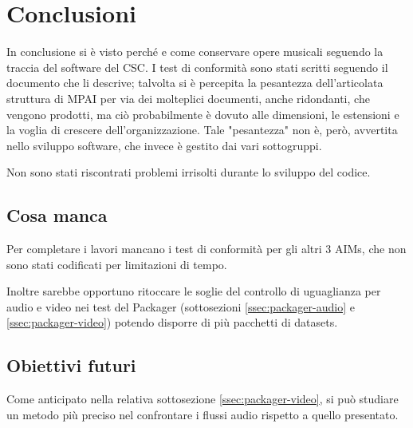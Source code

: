 
\chapter{Conclusioni} \label{chp:conclusioni}
In conclusione si è visto perché e come conservare opere musicali seguendo la traccia del software del \ac{CSC}.
I test di conformità sono stati scritti seguendo il documento che li descrive; talvolta si è percepita la pesantezza dell'articolata struttura di \ac{MPAI} per via dei molteplici documenti, anche ridondanti, che vengono prodotti, ma ciò probabilmente è dovuto alle dimensioni, le estensioni e la voglia di crescere dell'organizzazione. Tale "pesantezza" non è, però, avvertita nello sviluppo software, che invece è gestito dai vari sottogruppi.

Non sono stati riscontrati problemi irrisolti durante lo sviluppo del codice.


\section{Cosa manca}  %
Per completare i lavori mancano i test di conformità per gli altri 3 \acp{AIM}, che non sono stati codificati per limitazioni di tempo.

Inoltre sarebbe opportuno ritoccare le soglie del controllo di uguaglianza per audio e video nei test del Packager (sottosezioni \ref{ssec:packager-audio} e \ref{ssec:packager-video}) potendo disporre di più pacchetti di datasets.


\section{Obiettivi futuri}  %
Come anticipato nella relativa sottosezione \ref{ssec:packager-video}, si può studiare un metodo più preciso nel confrontare i flussi audio rispetto a quello presentato.


